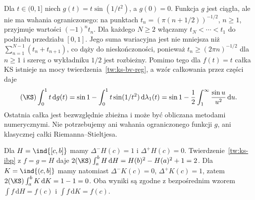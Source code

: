 \begin{przyklad}
Dla $t\in(0,1]$ niech $g(t)=t\sin(1/t^2)$, a $g(0)=0$. Funkcja $g$ jest ciągła, ale nie ma wahania ograniczonego: na punktach $t_n=(\pi(n+1/2))^{-1/2}$, $n\ge1$, przyjmuje wartości $(-1)^nt_n$. Dla każdego $N\ge2$ włączamy $t_N<\cdots<t_1$ do podziału przedziału $[0,1]$. Jego suma wariacyjna jest nie mniejsza niż $\sum_{n=1}^{N-1}(t_n+t_{n+1})$, co dąży do nieskończoności, ponieważ $t_n\ge (2\pi n)^{-1/2}$ dla $n\ge1$ i szereg o wykładniku $1/2$ jest rozbieżny. Pomimo tego dla $f(t)=t$ całka KS istnieje na mocy twierdzenia~\ref{tw:ks-bv-reg}, a wzór całkowania przez części daje
\[
 (\KS)\int_0^1 t\,\mathrm dg(t)
 =\sin1-\int_0^1 t\sin(1/t^2)\,\mathrm d\lambda_1(t)
 =\sin1-\frac12\int_1^\infty\frac{\sin u}{u^2}\,\mathrm du.
\]
Ostatnia całka jest bezwzględnie zbieżna i może być obliczana metodami numerycznymi. Nie potrzebujemy ani wahania ograniczonego funkcji $g$, ani klasycznej całki Riemanna--Stieltjesa.
\end{przyklad}

\begin{przyklad}
Dla $H=\ind{[c,b]}$ mamy $\Delta^-H(c)=1$ i $\Delta^+H(c)=0$. Twierdzenie~\ref{tw:ks-ibp} z $f=g=H$ daje
$2(\KS)\int_a^b H\,\mathrm dH=H(b)^2-H(a)^2+1=2$. Dla $K=\ind{(c,b]}$ mamy natomiast $\Delta^-K(c)=0$, $\Delta^+K(c)=1$, zatem $2(\KS)\int_a^b K\,\mathrm dK=1-1=0$. Oba wyniki są zgodne z bezpośrednim wzorem $\int f\,\mathrm dH=f(c)$ i $\int f\,\mathrm dK=f(c)$.
\end{przyklad}

